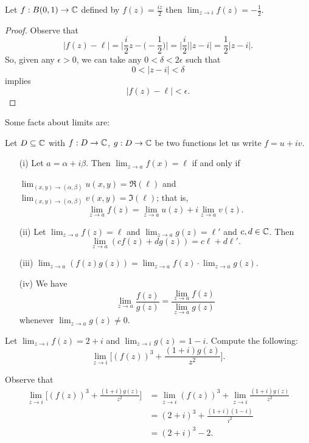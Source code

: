 \documentclass[a4paper]{report}
\begin{document}
\begin{eg}
    Let \( f: B(0,1) \to \mathbb{C}  \) defined by \( f(z) = \frac{ iz }{ 2  }  \) then \( \lim_{ z \to i }  f(z) = - \frac{ 1 }{ 2 }  \).
\end{eg}
\begin{proof}
Observe that 
\[  | f(z) - \ell | = \Big| \frac{ i }{ 2 } z - \Big(  - \frac{ 1 }{ 2 }  \Big) \Big| = \Big| \frac{ i }{ 2 }  \Big|  | z - i  |  = \frac{ 1 }{ 2 }  | z - i  |.  \]
So, given any \( \epsilon > 0  \), we can take any \( 0 < \delta< 2 \epsilon  \) such that 
\[  0 < | z - i  | < \delta  \] implies 
\[  | f(z) - \ell | < \epsilon. \]
\end{proof}

Some facts about limits are:

\begin{theorem}[ ]
    Let \( D \subseteq \mathbb{C}  \) with \( f: D \to \mathbb{C}  \), \( g: D \to \mathbb{C}  \) be two functions let us write \( f = u + i v \).
    \begin{enumerate}
        \item[(i)] Let \( a = \alpha + i \beta \). Then \( \lim_{ z \to a  } f(x) = \ell \) if and only if 
        \begin{center}
            \( \lim_{ (x,y) \to (\alpha, \beta) } u(x,y) = \Re(\ell)  \) and \( \lim_{ (x,y) \to (\alpha, \beta)  } v(x,y) = \Im(\ell) \); that is,
            \[  \lim_{ z \to a }  f(z) = \lim_{ z \to a }  u(z) + i \lim_{ z \to a } v(z). \] 
        \end{center}
    \item[(ii)] Let \( \lim_{ z \to  a  }  f(z) = \ell  \) and \( \lim_{ z \to a } g(z) = \ell' \) and \( c,d \in \mathbb{C}  \). Then
        \[  \lim_{ z \to a }  (cf(z) + dg(z)) = c \ell + d \ell'.  \]
    \item[(iii)] \( \lim_{ z \to a } (f(z)g(z)) = \lim_{ z \to a } f(z) \cdot \lim_{ z \to a }  g(z) \).
    \item[(iv)] We have
        \[  \lim_{ z \to a }  \frac{ f(z) }{ g(z) }  = \frac{ \lim_{ z \to a }  f(z) }{ \lim_{ z \to a } g(z) }  \]
        whenever \( \lim_{ z \to a } g(z) \neq 0  \).
    \end{enumerate}
\end{theorem}

\begin{problem}
    Let \( \lim_{ z \to i } f(z) = 2 + i    \) and \( \lim_{ z \to i }  g(z) = 1 - i  \). Compute the following:
    \[ \lim_{ z \to i }  \Big[ (f(z))^{3} + \frac{ (1+i) g(z) }{ z^{2} } \Big]. \]
\end{problem} 
\begin{solution}
Observe that 
\begin{align*}
  \lim_{ z \to i }  \Big[(f(z))^{3} + \frac{ (1+i) g(z) }{ z^{2} } \Big]  &= \lim_{ z \to i }  (f(z))^{3} + \lim_{ z \to i }  \frac{ (1+i) g(z)  }{ z^{2} }  \\
                                                                          &= (2+i)^{3} + \frac{ (1+i) (1-i) }{ i^{2} } \\
                                                                          &= (2+i)^{3} -2. 
\end{align*}
\end{solution}
\end{document}
